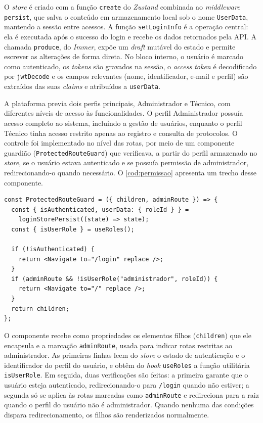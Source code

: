 O \textit{store} é criado com a função \texttt{create} do \textit{Zustand} combinada ao \textit{middleware} \texttt{persist}, que salva o conteúdo em armazenamento local sob o nome \texttt{UserData}, mantendo a sessão entre acessos. A função \texttt{setLoginInfo} é a operação central: ela é executada após o sucesso do login e recebe os dados retornados pela API. A chamada \texttt{produce}, do \textit{Immer}, expõe um \textit{draft} mutável do estado e permite escrever as alterações de forma direta. No bloco interno, o usuário é marcado como autenticado, os \textit{tokens} são gravados na sessão, o \textit{access token} é decodificado por \texttt{jwtDecode} e os campos relevantes (nome, identificador, e-mail e perfil) são extraídos das suas \textit{claims} e atribuídos a \texttt{userData}.

 A plataforma previa dois perfis principais, Administrador e Técnico, com diferentes níveis de acesso às funcionalidades. O perfil Administrador possuía acesso completo ao sistema, incluindo a gestão de usuários, enquanto o perfil Técnico tinha acesso restrito apenas ao registro e consulta de protocolos. O controle foi implementado no nível das rotas, por meio de um componente guardião (\texttt{ProtectedRouteGuard}) que verificava, a partir do perfil armazenado no \textit{store}, se o usuário estava autenticado e se possuía permissão de administrador, redirecionando-o quando necessário. O \autoref{cod:permissao} apresenta um trecho desse componente.

\begin{lstlisting}[caption={Trecho do componente de guarda de rotas por perfil de usuário.}, label={cod:permissao}]
const ProtectedRouteGuard = ({ children, adminRoute }) => {
  const { isAuthenticated, userData: { roleId } } =
    loginStorePersist((state) => state);
  const { isUserRole } = useRoles();

  if (!isAuthenticated) {
    return <Navigate to="/login" replace />;
  }
  if (adminRoute && !isUserRole("administrador", roleId)) {
    return <Navigate to="/" replace />;
  }
  return children;
};
\end{lstlisting}

O componente recebe como propriedades os elementos filhos (\texttt{children}) que ele encapsula e a marcação \texttt{adminRoute}, usada para indicar rotas restritas ao administrador. As primeiras linhas leem do \textit{store} o estado de autenticação e o identificador do perfil do usuário, e obtêm do \textit{hook} \texttt{useRoles} a função utilitária \texttt{isUserRole}. Em seguida, duas verificações são feitas: a primeira garante que o usuário esteja autenticado, redirecionando-o para \texttt{/login} quando não estiver; a segunda só se aplica às rotas marcadas como \texttt{adminRoute} e redireciona para a raiz quando o perfil do usuário não é administrador. Quando nenhuma das condições dispara redirecionamento, os filhos são renderizados normalmente.

